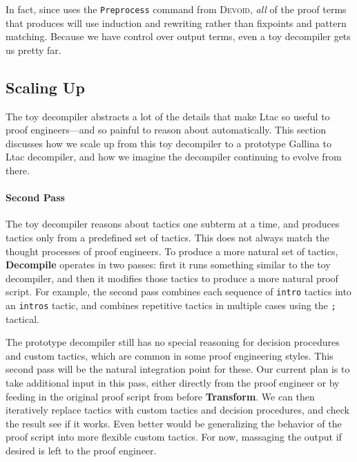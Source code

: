 In fact, since \toolname uses the \lstinline{Preprocess} command from \textsc{Devoid}, \textit{all} of the proof terms that \toolname
produces will use induction and rewriting rather than fixpoints and pattern matching.
Because we have control over output terms, even a toy decompiler gets us pretty far.


\subsection{Scaling Up}
\label{sec:second}

The toy decompiler abstracts a lot of the details that make Ltac so useful to proof engineers---and so painful to 
reason about automatically.
This section discusses how we scale up from this toy decompiler to a prototype Gallina to Ltac decompiler,
and how we imagine the decompiler continuing to evolve from there.

\paragraph{Second Pass}
The toy decompiler reasons about tactics one subterm at a time, and produces tactics only from a predefined set of tactics.
This does not always match the thought processes of proof engineers.
To produce a more natural set of tactics, \textbf{Decompile} operates in two passes: first it runs something similar to the toy decompiler, and then it modifies those tactics to produce a more natural proof script.
For example, the second pass combines each sequence of \lstinline{intro} tactics into an \lstinline{intros} tactic,
and combines repetitive tactics in multiple cases using the \lstinline{;} tactical.

The prototype decompiler still has no special reasoning for decision procedures and custom tactics, which are common
in some proof engineering styles.
This second pass will be the natural integration point for these.
Our current plan is to take additional input in this pass, either directly from the proof engineer
or by feeding in the original proof script from before \textbf{Transform}.
We can then iteratively replace tactics with custom tactics and decision procedures, and check the result see if it works.
Even better would be generalizing the behavior of the proof script into more flexible custom tactics.
For now, massaging the output if desired is left to the proof engineer.

